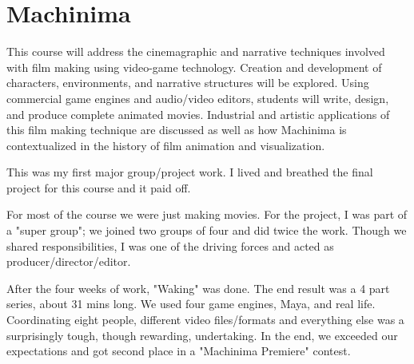 \section{Machinima}

\begin{meta}
\end{meta}


\coursedesc
This course will address the cinemagraphic and narrative techniques
involved with film making using video-game technology. Creation and
development of characters, environments, and narrative structures will
be explored. Using commercial game engines and audio/video editors,
students will write, design, and produce complete animated movies.
Industrial and artistic applications of this film making technique are
discussed as well as how Machinima is contextualized in the history of
film animation and visualization.

\courseself
This was my first major group/project work. I lived and breathed the
final project for this course and it paid off.

For most of the course we were just making movies. For the project, I
was part of a "super group"; we joined two groups of four and did twice
the work. Though we shared responsibilities, I was one of the driving
forces and acted as producer/director/editor.

After the four weeks of work, "Waking" was done. The end result was a 4
part series, about 31 mins long. We used four game engines, Maya, and
real life. Coordinating eight people, different video files/formats and
everything else was a surprisingly tough, though rewarding, undertaking.
In the end, we exceeded our expectations and got second place in a
"Machinima Premiere" contest.

